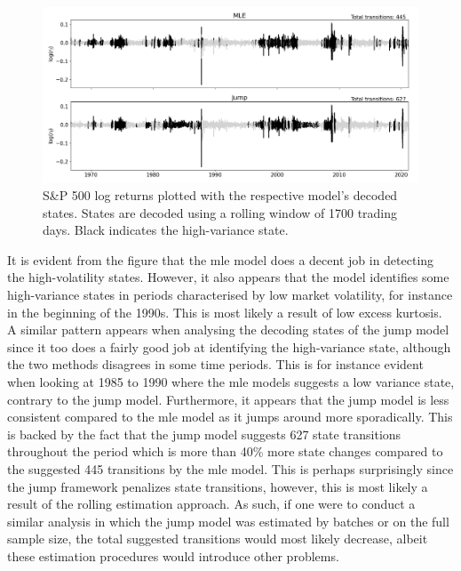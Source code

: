 \begin{figure}[H] 
    \centering
    \includegraphics[width=1.0\textwidth]{analysis/stylized_facts/images/decoded_states.png}
    \caption{S\&P 500 log returns plotted with the respective model's decoded states. States are decoded using a rolling window of 1700 trading days. Black indicates the high-variance state.}
    \label{fig:stylized_facts_decoded_states} 
\end{figure}

It is evident from the figure that the mle model does a decent job in detecting the high-volatility states. However, it also appears that the model identifies some high-variance states in periods characterised by low market volatility, for instance in the beginning of the 1990s. This is most likely a result of low excess kurtosis. A similar pattern appears when analysing the decoding states of the jump model since it too does a fairly good job at identifying the high-variance state, although the two methods disagrees in some time periods. This is for instance evident when looking at 1985 to 1990 where the mle models suggests a low variance state, contrary to the jump model. Furthermore, it appears that the jump model is less consistent compared to the mle model as it jumps around more sporadically. This is backed by the fact that the jump model suggests 627 state transitions throughout the period which is more than 40\% more state changes compared to the suggested 445 transitions by the mle model. This is perhaps surprisingly since the jump framework penalizes state transitions, however, this is most likely a result of the rolling estimation approach. As such, if one were to conduct a similar analysis in which the jump model was estimated by batches or on the full sample size, the total suggested transitions would most likely decrease, albeit these estimation procedures would introduce other problems. 

